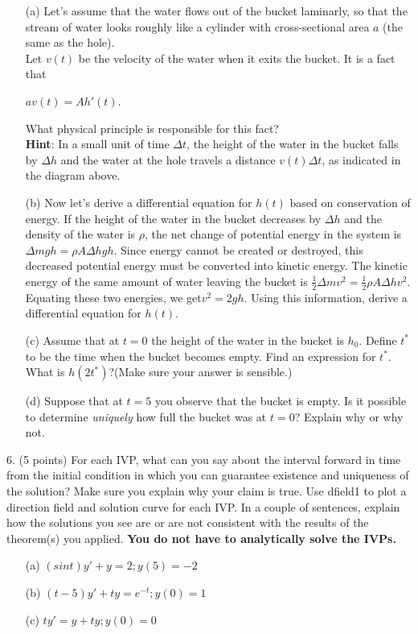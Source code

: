 \documentclass[12pt,letterpaper]{hmcpset}
\begin{document}
\begin{problem}
\begin{enumerate}
    \item[(a)] Let’s assume that the water flows out of the bucket laminarly, so that the stream of
water looks roughly like a cylinder with cross-sectional area $a$ (the same as the hole).\\ 
Let $v(t)$ be the velocity of the water when it exits the bucket. It is a fact that
\begin{center}
    $av(t) = Ah'(t)$.
\end{center}
What physical principle is responsible for this fact?\\
\textbf{Hint}: In a small unit of time $\Delta t$, the height of the water in the bucket falls by $\Delta h$ and
the water at the hole travels a distance $v(t)\Delta t$, as indicated in the diagram above.
    \item[(b)] Now let’s derive a differential equation for $h(t)$ based on conservation of energy. If the
height of the water in the bucket decreases by $\Delta h$ and the density of the water is $\rho$,
the net change of potential energy in the system is$ \Delta mgh = \rho A\Delta hgh$. Since energy
cannot be created or destroyed, this decreased potential energy must be converted into
kinetic energy. The kinetic energy of the same amount of water leaving the bucket
is $\frac{1}{2}\Delta mv^2 =\frac{1}{2}\rho A\Delta hv^2$. Equating these two energies, we get$v^2 = 2gh$. Using this
information, derive a differential equation for $h(t)$.
    \item[(c)] Assume that at $t = 0$ the height of the water in the bucket is $h_0$. Define $t^\ast$ to be the time when the bucket becomes empty. Find an expression for $t^\ast$. What is $h(2t^\ast)$?(Make sure your answer is sensible.)
    \item[(d)] Suppose that at $t = 5$ you observe that the bucket is empty. Is it possible to determine
\textit{uniquely} how full the bucket was at $t = 0$? Explain why or why not.
\end{enumerate}

\end{problem}
\newpage

\begin{problem}
6. (5 points) For each IVP, what can you say about the interval forward in time from the initial
condition in which you can guarantee existence and uniqueness of the solution? Make sure
you explain why your claim is true. Use dfield1
to plot a direction field and solution curve for
each IVP. In a couple of sentences, explain how the solutions you see are or are not consistent
with the results of the theorem(s) you applied. \textbf{You do not have to analytically solve
the IVPs.}

\begin{enumerate}
    \item[(a)] $(sin t)y' + y = 2; y(5) = -2$
    \item[(b)]  $(t - 5)y' + ty = e^{-t}; y(0) = 1$
    \item[(c)] $ty' = y + ty; y(0) = 0$
\end{enumerate}
\end{problem}
\newpage
\end{document}
